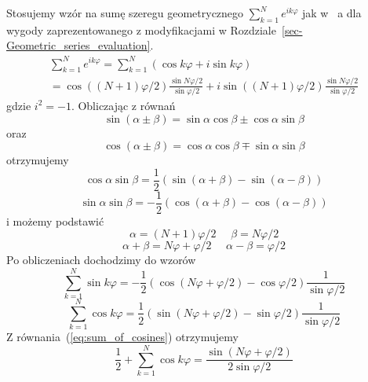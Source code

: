 
Stosujemy wzór na sumę szeregu geometrycznego $\sum_{k=1}^{N} e^{i k \varphi}$ jak w~\cite{kn:Hirst_Book}
a dla wygody zaprezentowanego z modyfikacjami w Rozdziale~\ref{sec-Geometric_series_evaluation}\@.
\begin{eqnarray}
\sum_{k=1}^{N} e^{i k \varphi}
=
\sum_{k=1}^{N} (\cos k \varphi + i \sin k \varphi)         \\ \nonumber
=
\cos((N+1) \varphi/2) \frac{\sin N \varphi/2}{\sin \varphi/2} + i \sin((N+1) \varphi/2) \frac{\sin N \varphi/2}{\sin \varphi/2}
\end{eqnarray}
gdzie $i^2=-1$\@.
Obliczając z równań
\begin{equation}
\sin(\alpha \pm \beta) = \sin \alpha \cos \beta \pm \cos \alpha \sin \beta
\end{equation}
oraz
\begin{equation}
\cos(\alpha \pm \beta) = \cos \alpha \cos \beta \mp \sin \alpha \sin \beta
\end{equation}
otrzymujemy
\begin{equation}
\cos \alpha \sin \beta = \frac{1}{2}(\sin(\alpha + \beta) - \sin(\alpha - \beta))
\end{equation}
\begin{equation}
\sin \alpha \sin \beta = - \frac{1}{2}(\cos(\alpha + \beta) - \cos(\alpha - \beta))
\end{equation}
i możemy podstawić
\begin{equation}
\alpha = (N+1)\varphi/2 \,\,\,\,\,\,\,\, \beta=N \varphi/2
\end{equation}
\begin{equation}
\alpha + \beta = N\varphi+\varphi/2 \,\,\,\,\,\,\,\, \alpha - \beta = \varphi/2
\end{equation}
Po obliczeniach dochodzimy do wzorów
\begin{equation}
\sum_{k=1}^{N} \sin k \varphi = -\frac{1}{2} ( \cos(N\varphi+\varphi/2) - \cos \varphi/2 ) \frac{1}{\sin \varphi/2}
\end{equation}
\begin{equation}
\label{eq:sum_of_cosines}
\sum_{k=1}^{N} \cos k \varphi = \frac{1}{2} ( \sin(N\varphi+\varphi/2) - \sin \varphi/2 ) \frac{1}{\sin \varphi/2}
\end{equation}
Z równania~(\ref{eq:sum_of_cosines}) otrzymujemy
\begin{equation}
\label{eq:Sum_of_cos}
\frac{1}{2} + \sum_{k=1}^{N} \cos k \varphi 
=
\frac{\sin(N\varphi+\varphi/2)}{2 \sin \varphi/2}
\end{equation}


